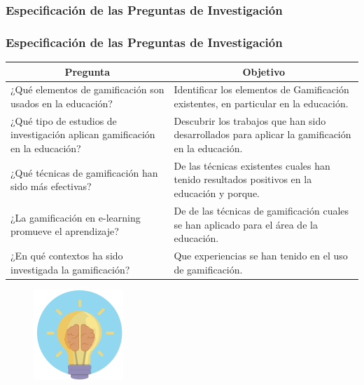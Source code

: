 \documentclass{beamer}
\begin{document}
\subsubsection{Especificación de las Preguntas de Investigación}
\begin{frame}
    \frametitle{Especificación de las Preguntas de Investigación}
    \begin{table}
                \begin{center}
                    \label{table:researchQuestions}
                    \begin{tabular}{| p{5.5cm} | p{5.5cm} |}
                        \hline
                        \multicolumn{1}{|c|}{\textbf{Pregunta}}  & \multicolumn{1}{|c|}{\textbf{Objetivo}} \\
                        \hline
                        ¿Qué elementos de gamificación son usados en la educación? & Identificar los elementos de Gamificación existentes, en particular en la educación. \\
                        \hline
                        ¿Qué tipo de estudios de investigación aplican gamificación en la educación? & Descubrir los trabajos que han sido desarrollados para aplicar la gamificación en la educación. \\
                        \hline
                        ¿Qué técnicas de gamificación han sido más efectivas? & De las técnicas existentes cuales han tenido resultados positivos en la educación y porque. \\
                        \hline
                        ¿La gamificación en e-learning promueve el aprendizaje? & De de las técnicas de gamificación cuales se han aplicado para el área de la educación.\\
                        \hline
                        ¿En qué contextos ha sido investigada la gamificación? & Que experiencias se han tenido en el uso de gamificación.\\
                        \hline
                    \end{tabular}
                \end{center}
            \end{table}
	\begin{figure}
		\begin{center}
			\includegraphics[scale=0.45]{images/2icons/need.png}
			\label{student}
		\end{center}
	\end{figure}
\end{frame}
\end{document}
